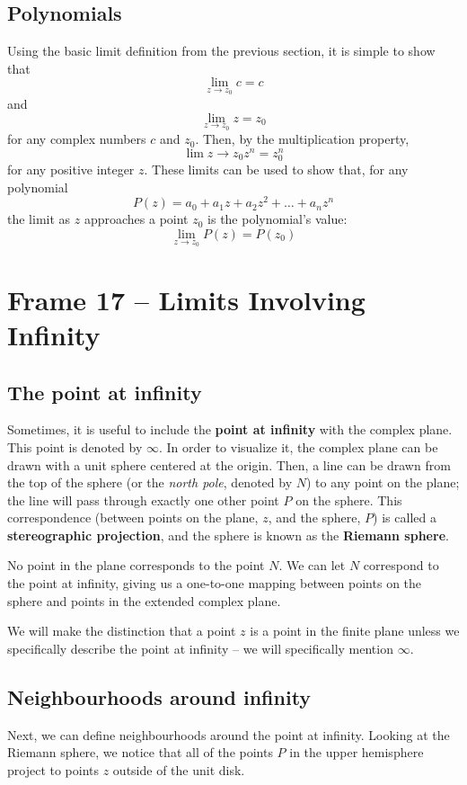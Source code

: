 \documentclass{article}
\renewcommand{\emph}{\textbf}
\begin{document}
\subsection{Polynomials}
Using the basic limit definition from the previous section, it is simple to show that
\[
	\lim_{z \to z_0} c = c
\]
and
\[
	\lim_{z \to z_0} z = z_0
\]
for any complex numbers $c$ and $z_0$. Then, by the multiplication property,
\[
	\lim{z \to z_0} z^n = z_0^n
\]
for any positive integer $z$. These limits can be used to show that, for any polynomial
\[
	P(z) = a_0 + a_1 z + a_2 z^2 + \dots + a_n z^n
\]
the limit as $z$ approaches a point $z_0$ is the polynomial's value:
\[
	\lim_{z \to z_0} P(z) = P(z_0)
\]


\clearpage
\section{Frame 17 -- Limits Involving Infinity}
\subsection{The point at infinity}
Sometimes, it is useful to include the \emph{point at infinity} with the complex plane. This point is denoted by $\infty$. In order to visualize it, the complex plane can be drawn with a unit sphere centered at the origin. Then, a line can be drawn from the top of the sphere (or the \textit{north pole}, denoted by $N$) to any point on the plane; the line will pass through exactly one other point $P$ on the sphere. This correspondence (between points on the plane, $z$, and the sphere, $P$) is called a \emph{stereographic projection}, and the sphere is known as the \emph{Riemann sphere}.

No point in the plane corresponds to the point $N$. We can let $N$ correspond to the point at infinity, giving us a one-to-one mapping between points on the sphere and points in the extended complex plane. 

We will make the distinction that a point $z$ is a point in the finite plane unless we specifically describe the point at infinity -- we will specifically mention $\infty$.

\subsection{Neighbourhoods around infinity}
Next, we can define neighbourhoods around the point at infinity. Looking at the Riemann sphere, we notice that all of the points $P$ in the upper hemisphere project to points $z$ outside of the unit disk. 
\end{document}
